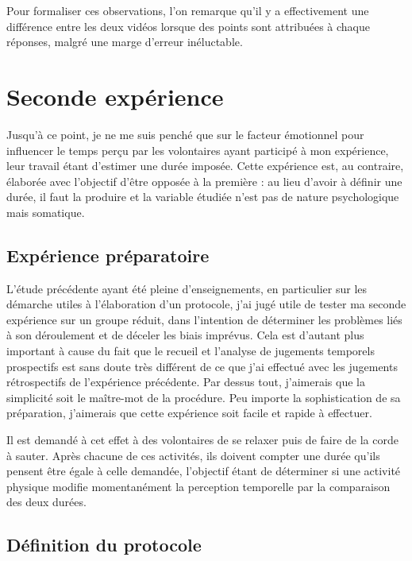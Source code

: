 \documentclass[12pt,fleqn,oneside,openany]{book} %
\begin{document}
Pour formaliser ces observations, l'on remarque qu'il y a effectivement une différence entre les deux vidéos lorsque des points sont attribuées à chaque réponses, malgré une marge d'erreur inéluctable.

\newpage
\section{Seconde expérience} \label{sec:exp2.1}
Jusqu'à ce point, je ne me suis penché que sur le facteur émotionnel pour influencer le temps perçu par les volontaires ayant participé à mon expérience, leur travail étant d'estimer une durée imposée. Cette expérience est, au contraire, élaborée avec l'objectif d'être opposée à la première : au lieu d'avoir à définir une durée, il faut la produire et la variable étudiée n'est pas de nature psychologique mais somatique. 

\subsection{Expérience préparatoire} \label{ssec:but2.1}
L'étude précédente ayant été pleine d'enseignements, en particulier sur les démarche utiles à l'élaboration d'un protocole, j'ai jugé utile de tester ma seconde expérience sur un groupe réduit, dans l'intention de déterminer les problèmes liés à son déroulement et de déceler les biais imprévus. Cela est d'autant plus important à cause du fait que le recueil et l'analyse de jugements temporels prospectifs est sans doute très différent de ce que j'ai effectué avec les jugements rétrospectifs de l'expérience précédente. Par dessus tout, j'aimerais que la simplicité soit le maître-mot de la procédure. Peu importe la sophistication de sa préparation, j'aimerais que cette expérience soit facile et rapide à effectuer.

Il est demandé à cet effet à des volontaires de se relaxer puis de faire de la corde à sauter. Après chacune de ces activités, ils doivent compter une durée qu'ils pensent être égale à celle demandée, l'objectif étant de déterminer si une activité physique modifie momentanément la perception temporelle par la comparaison des deux durées.

\subsection{Définition du protocole} \label{ssec:defProto2.1}
\end{document}
